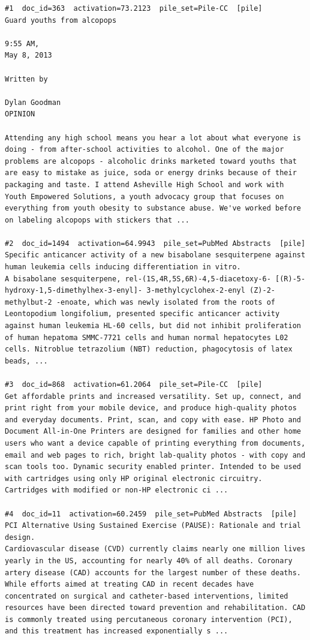 \begin{verbatim}
#1  doc_id=363  activation=73.2123  pile_set=Pile-CC  [pile]
Guard youths from alcopops

9:55 AM,
May 8, 2013

Written by

Dylan Goodman
OPINION

Attending any high school means you hear a lot about what everyone is doing - from after-school activities to alcohol. One of the major problems are alcopops - alcoholic drinks marketed toward youths that are easy to mistake as juice, soda or energy drinks because of their packaging and taste. I attend Asheville High School and work with Youth Empowered Solutions, a youth advocacy group that focuses on everything from youth obesity to substance abuse. We've worked before on labeling alcopops with stickers that ...

#2  doc_id=1494  activation=64.9943  pile_set=PubMed Abstracts  [pile]
Specific anticancer activity of a new bisabolane sesquiterpene against human leukemia cells inducing differentiation in vitro.
A bisabolane sesquiterpene, rel-(1S,4R,5S,6R)-4,5-diacetoxy-6- [(R)-5-hydroxy-1,5-dimethylhex-3-enyl]- 3-methylcyclohex-2-enyl (Z)-2-methylbut-2 -enoate, which was newly isolated from the roots of Leontopodium longifolium, presented specific anticancer activity against human leukemia HL-60 cells, but did not inhibit proliferation of human hepatoma SMMC-7721 cells and human normal hepatocytes L02 cells. Nitroblue tetrazolium (NBT) reduction, phagocytosis of latex beads, ...

#3  doc_id=868  activation=61.2064  pile_set=Pile-CC  [pile]
Get affordable prints and increased versatility. Set up, connect, and print right from your mobile device, and produce high-quality photos and everyday documents. Print, scan, and copy with ease. HP Photo and Document All-in-One Printers are designed for families and other home users who want a device capable of printing everything from documents, email and web pages to rich, bright lab-quality photos - with copy and scan tools too. Dynamic security enabled printer. Intended to be used with cartridges using only HP original electronic circuitry. Cartridges with modified or non-HP electronic ci ...

#4  doc_id=11  activation=60.2459  pile_set=PubMed Abstracts  [pile]
PCI Alternative Using Sustained Exercise (PAUSE): Rationale and trial design.
Cardiovascular disease (CVD) currently claims nearly one million lives yearly in the US, accounting for nearly 40% of all deaths. Coronary artery disease (CAD) accounts for the largest number of these deaths. While efforts aimed at treating CAD in recent decades have concentrated on surgical and catheter-based interventions, limited resources have been directed toward prevention and rehabilitation. CAD is commonly treated using percutaneous coronary intervention (PCI), and this treatment has increased exponentially s ...


\end{verbatim}
